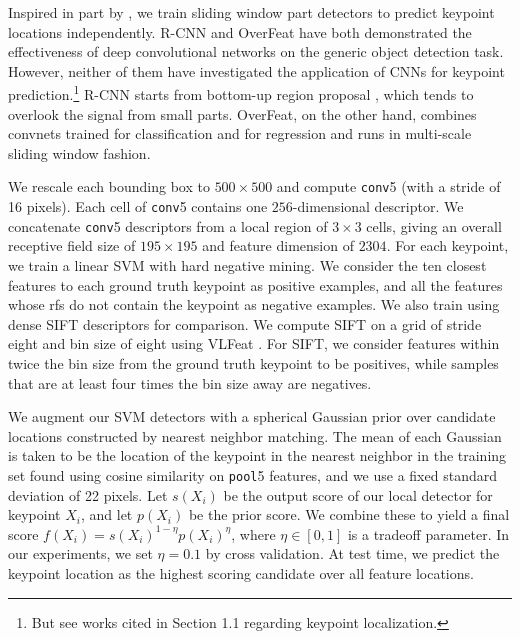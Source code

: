 \documentclass{article} %
\begin{document}

Inspired in part by \cite{RossJeff, overfeat, HumanPoseICLR}, we train sliding
window part detectors to predict keypoint locations independently.  R-CNN
\cite{RossJeff} and OverFeat \cite{overfeat} have both demonstrated the
effectiveness of deep convolutional networks on the generic object detection
task. However, neither of them have investigated the application of CNNs for
keypoint prediction.\footnote{But see works cited in Section 1.1 regarding
keypoint localization.} R-CNN starts from bottom-up region proposal
\cite{selsearch}, which tends to overlook the signal from small parts. OverFeat, on
the other hand, combines convnets trained for classification and
for regression and runs in multi-scale sliding window fashion.

We rescale each bounding box to $500 \times 500$ and compute \texttt{conv}5
(with a stride of 16 pixels).
Each cell of
\texttt{conv}5 contains one $256$-dimensional descriptor.
We concatenate \texttt{conv}5 descriptors from a local region of $3 \times 3$ 
cells, giving an overall receptive field size of $195 \times 195$ and feature
dimension of $2304$.
For each
keypoint, we train a linear SVM with hard negative mining.
We consider the ten closest features to each ground truth keypoint as positive
examples, and all the features whose rfs do not contain the keypoint as negative
examples.
We also train using dense SIFT descriptors for comparison.
We compute SIFT on a grid of stride eight
 and bin size of eight using VLFeat
\cite{vedaldi08vlfeat}.
For SIFT, we consider features within twice the bin
size from the ground truth keypoint to be positives,
while samples that are at least four times the bin size away are negatives.

We augment our SVM detectors with a spherical Gaussian prior over candidate locations
constructed by nearest neighbor matching.
The mean of each Gaussian is taken to be the location of the keypoint
in the nearest neighbor in the training set found using cosine similarity
on \texttt{pool}5 features, and we use a fixed standard deviation of 22 pixels.
Let $s(X_i)$ be the output score of our local detector for
keypoint $X_i$, and let $p(X_i)$ be the prior score.
We combine these to yield a final score $f(X_i) = s(X_i)^{1 - \eta}
p(X_i) ^ \eta$,
where $\eta \in [0,1]$ is a tradeoff parameter.
In our experiments, we set $\eta = 0.1$ by cross validation.
At test time, we predict the keypoint location as the highest scoring candidate
over all feature locations.
\end{document}
